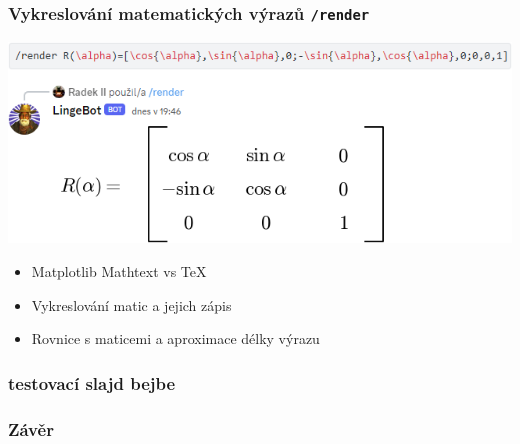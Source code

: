 \documentclass[FM]{tulpresentation}
\begin{document}
	\begin{frame}\frametitle{Vykreslování matematických výrazů \texttt{/render}}
		\includegraphics[width=.95\paperwidth]{img/idk2}
		\begin{itemize}
			\item Matplotlib Mathtext vs TeX
			\item Vykreslování matic a jejich zápis
			\item Rovnice s maticemi a aproximace délky výrazu
		\end{itemize}
	\end{frame}
	
	\begin{frame}[plain]\frametitle{testovací slajd bejbe}
	\end{frame}
	
	\begin{frame}\frametitle{Závěr}
		
	\end{frame}
	
	\TULendframe
\end{document}

